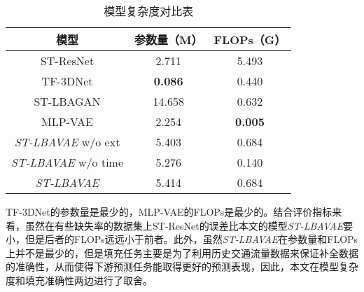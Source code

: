 \begin{table}[htbp] 
\caption{模型复杂度对比表} \label{model_complx}
\vspace{0.5em}\centering\wuhao
\begin{tabular}{ccc}
\toprule[1.5pt]
模型 & 参数量（M） & FLOPs（G）\\
\midrule[1pt]
ST-ResNet    & 2.711  & 5.493   \\
TF-3DNet     & \textbf{0.086}  & 0.440    \\
ST-LBAGAN    & 14.658 & 0.632     \\
MLP-VAE      & 2.254  & \textbf{0.005}     \\
\textit{ST-LBAVAE} w/o ext & 5.403  & 0.684     \\
\textit{ST-LBAVAE} w/o time  & 5.276  & 0.140    \\
\textit{ST-LBAVAE}      & 5.414  & 0.684    \\
\bottomrule[1.5pt]
\end{tabular}
\end{table}

TF-3DNet的参数量是最少的，MLP-VAE的FLOPs是最少的。结合评价指标来看，虽然在有些缺失率的数据集上ST-ResNet的误差比本文的模型\textit{ST-LBAVAE}要小，但是后者的FLOPs远远小于前者。此外，虽然\textit{ST-LBAVAE}在参数量和FLOPs上并不是最少的，但是填充任务主要是为了利用历史交通流量数据来保证补全数据的准确性，从而使得下游预测任务能取得更好的预测表现，因此，本文在模型复杂度和填充准确性两边进行了取舍。

